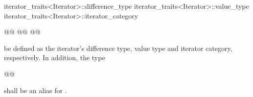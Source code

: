 \begin{removedblock}
\begin{codeblock}
iterator_traits<Iterator>::difference_type
iterator_traits<Iterator>::value_type
iterator_traits<Iterator>::iterator_category
\end{codeblock}
\end{removedblock}
\begin{addedblock}
\begin{codeblock}
@@
@@
@@
\end{codeblock}
\end{addedblock}

be defined as the iterator's difference type, value type and iterator category, respectively.
In addition, the type

\begin{addedblock}
\begin{codeblock}
@@
\end{codeblock}

shall be an alias for .
\end{addedblock}

